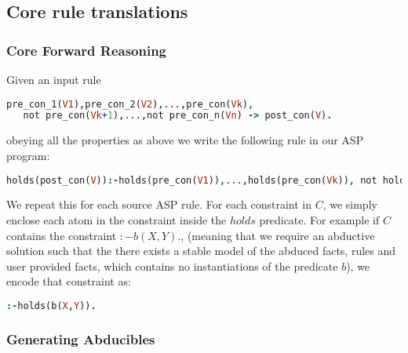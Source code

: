 \documentclass[sigconf]{acmart}
\begin{document}
\subsection{Core rule translations}

\subsubsection{Core Forward Reasoning}
Given an input rule 
\begin{lstlisting}[language=Prolog,frame=none]
pre_con_1(V1),pre_con_2(V2),...,pre_con(Vk),
   not pre_con(Vk+1),...,not pre_con_n(Vn) -> post_con(V).
\end{lstlisting}
obeying all the properties as above we write the following rule in our ASP program: 
\begin{lstlisting}[language=Prolog,frame=none]
holds(post_con(V)):-holds(pre_con(V1)),...,holds(pre_con(Vk)), not holds(pre_con(Vk+1)), ..., not holds(pre_con(Vn)). 
\end{lstlisting}

We repeat this for each source ASP rule. For each constraint in $C$, we simply
enclose each atom in the constraint inside the $holds$ predicate. For example
if $C$ contains the constraint $:-b(X,Y).$, (meaning that we require an
abductive solution such that the there exists a stable model of the abduced
facts, rules and user provided facts, which contains no instantiations of the
predicate $b$), we encode that constraint as: 
\begin{lstlisting}[language=Prolog,frame=none]
:-holds(b(X,Y)).
\end{lstlisting}

\subsubsection{Generating Abducibles}
\end{document}
